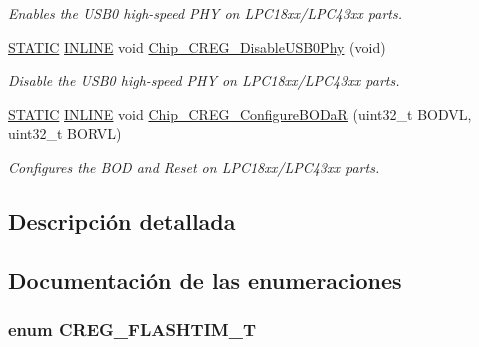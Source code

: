 \begin{DoxyCompactItemize}
\begin{DoxyCompactList}\small\item\em Enables the U\+S\+B0 high-\/speed P\+HY on L\+P\+C18xx/\+L\+P\+C43xx parts. \end{DoxyCompactList}\item 
\hyperlink{group___l_p_c___types___public___macros_ga10b2d890d871e1489bb02b7e70d9bdfb}{S\+T\+A\+T\+IC} \hyperlink{spifi__18xx__43xx_8h_a2eb6f9e0395b47b8d5e3eeae4fe0c116}{I\+N\+L\+I\+NE} void \hyperlink{group___c_r_e_g__18_x_x__43_x_x_ga604f1e681ee7fcd16b9fe57c12e3e135}{Chip\+\_\+\+C\+R\+E\+G\+\_\+\+Disable\+U\+S\+B0\+Phy} (void)
\begin{DoxyCompactList}\small\item\em Disable the U\+S\+B0 high-\/speed P\+HY on L\+P\+C18xx/\+L\+P\+C43xx parts. \end{DoxyCompactList}\item 
\hyperlink{group___l_p_c___types___public___macros_ga10b2d890d871e1489bb02b7e70d9bdfb}{S\+T\+A\+T\+IC} \hyperlink{spifi__18xx__43xx_8h_a2eb6f9e0395b47b8d5e3eeae4fe0c116}{I\+N\+L\+I\+NE} void \hyperlink{group___c_r_e_g__18_x_x__43_x_x_ga060a0c5a349e123114449c22e91b495f}{Chip\+\_\+\+C\+R\+E\+G\+\_\+\+Configure\+B\+O\+DaR} (uint32\+\_\+t B\+O\+D\+VL, uint32\+\_\+t B\+O\+R\+VL)
\begin{DoxyCompactList}\small\item\em Configures the B\+OD and Reset on L\+P\+C18xx/\+L\+P\+C43xx parts. \end{DoxyCompactList}\end{DoxyCompactItemize}


\subsection{Descripción detallada}


\subsection{Documentación de las enumeraciones}
\subsubsection[{\texorpdfstring{C\+R\+E\+G\+\_\+\+F\+L\+A\+S\+H\+T\+I\+M\+\_\+T}{CREG_FLASHTIM_T}}]{\setlength{\rightskip}{0pt plus 5cm}enum {\bf C\+R\+E\+G\+\_\+\+F\+L\+A\+S\+H\+T\+I\+M\+\_\+T}}\hypertarget{group___c_r_e_g__18_x_x__43_x_x_gaecbf266e1dc43b19d1cca3b7cc800786}{}\label{group___c_r_e_g__18_x_x__43_x_x_gaecbf266e1dc43b19d1cca3b7cc800786}


